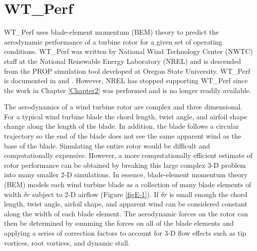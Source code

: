 
\chapter{WT\_Perf} %

\label{AppendixE} %


WT\_Perf uses blade-element momentum (BEM) theory to predict the aerodynamic performance of a turbine rotor for a given set of operating conditions. WT\_Perf was written by National Wind Technology Center (NWTC) staff at the National Renewable Energy Laboratory (NREL) and is descended from the PROP simulation tool developed at Oregon State University. WT\_Perf is documented in \cite{buhl2012} and \cite{buhl2012}. However, NREL has stopped supporting WT\_Perf since the work in Chapter \ref{Chapter2} was performed and \cite{buhl2012} is no longer readily available.

The aerodynamics of a wind turbine rotor are complex and three dimensional. For a typical wind turbine blade the chord length, twist angle, and airfoil shape change along the length of the blade. In addition, the blade follows a circular trajectory so the end of the blade does not see the same apparent wind as the base of the blade. Simulating the entire rotor would be difficult and computationally expensive. However, a more computationally efficient estimate of rotor performance can be obtained by breaking this large complex 3-D problem into many smaller 2-D simulations. In essence, blade-element momentum theory (BEM) models each wind turbine blade as a collection of many blade elements of width $\delta{r}$ subject to 2-D airflow (Figure \ref{figE-1}). If $\delta{r}$ is small enough the chord length, twist angle, airfoil shape, and apparent wind can be considered constant along the width of each blade element. The aerodynamic forces on the rotor can then be determined by summing the forces on all of the blade elements and applying a series of correction factors to account for 3-D flow effects such as tip vortices, root vortices, and dynamic stall. 



